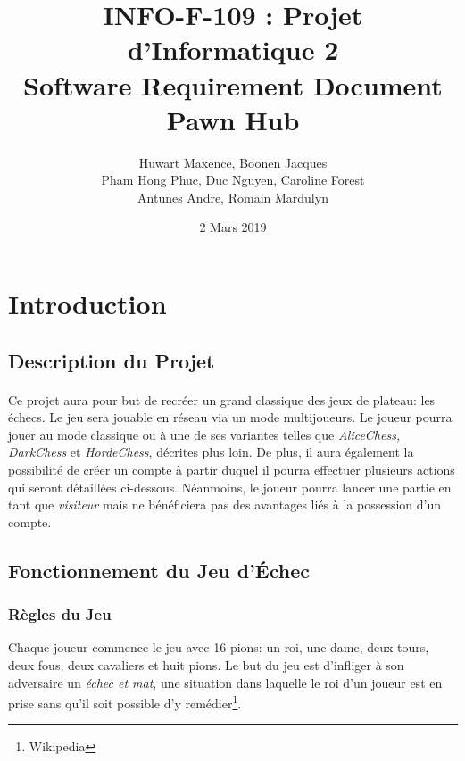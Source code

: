 \documentclass[10pt, a4paper]{article}
\title{\LARGE{INFO-F-109 : Projet d'Informatique 2 }\\
       \textbf{Software Requirement Document\\
	   Pawn Hub}}
\author{Huwart Maxence, Boonen Jacques\\
		Pham Hong Phuc, Duc Nguyen, Caroline Forest\\
		Antunes Andre, Romain Mardulyn}
\date{2 Mars 2019}
\begin{document}
	\maketitle
	\newpage
	\renewcommand{\contentsname}{Table des Matières}
	\tableofcontents %
	\newpage
	\section{Introduction}
		\subsection{Description du Projet}
			\paragraph{}Ce projet aura pour but de recréer un grand classique des jeux de plateau: les échecs. Le jeu sera jouable en réseau via un mode multijoueurs. Le joueur pourra jouer au mode classique ou à une de ses variantes telles que  {\itshape AliceChess, DarkChess} et {\itshape HordeChess}, décrites plus loin. De plus, il aura également la possibilité de créer un compte à partir duquel il pourra effectuer plusieurs actions qui seront détaillées ci-dessous. Néanmoins, le joueur pourra lancer une partie en tant que {\itshape visiteur} mais ne bénéficiera pas des avantages liés à la possession d'un compte.\\
			\subsection{Fonctionnement du Jeu d'Échec}
			\subsubsection{Règles du Jeu}
			Chaque joueur commence le jeu avec 16 pions: un roi, une dame, deux tours, deux fous, deux cavaliers et huit pions. Le but du jeu est d'infliger à son adversaire un \textit{échec et mat}, une situation dans laquelle le roi d'un joueur est en prise sans qu'il soit possible d'y remédier\footnote{Wikipedia}.
\end{document}
